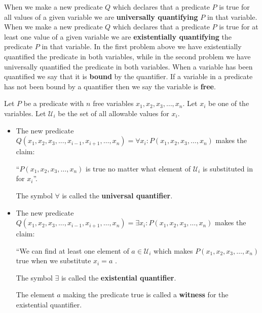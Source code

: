 When we make a new predicate $Q$ which declares that a predicate $P$ is true for all values of a given variable we are \textbf{universally quantifying} $P$ in that variable.   When we make a new predicate $Q$ which declares that a predicate $P$ is true for at least one value of a given variable we are \textbf{existentially quantifying} the predicate $P$ in that variable.  In the first problem above we have existentially quantified the predicate in both variables, while in the second problem we have universally quantified the predicate in both variables.  When a variable has been quantified we say that it is \textbf{bound} by the quantifier.  If a variable in a predicate has not been bound by a quantifier then we say the variable is \textbf{free}.

\begin{definition}
	Let $P$ be a predicate with $n$ free variables $x_1,x_2,x_3, \dots, x_n$.  
	Let $x_i$ be one of the variables. Let $\mathcal{U}_i$ be the set of all allowable values for $x_i$.
		\begin{itemize} 
			\item The new predicate $Q(x_1,x_2, x_3, ..., x_{i-1}, x_{i+1}, \dots , x_n) = \forall x_i  : P(x_1,x_2,x_3, \dots, x_n)$ makes the claim:
			
			``$P(x_1,x_2,x_3, \dots, x_n)$ is true no matter what element of $\mathcal{U}_i$ is substituted in for $x_i$''.
			
			The symbol $\forall$ is called the \textbf{universal quantifier}.
			
			\item The new predicate $Q(x_1,x_2, x_3, ..., x_{i-1}, x_{i+1}, \dots , x_n) = \exists x_i  : P(x_1,x_2,x_3, \dots, x_n)$ makes the claim:

``We can find at least one element of $a \in \mathcal{U}_i$ which makes $P(x_1,x_2,x_3, \dots, x_n)$ true when we substitute $x_i = a$ .

The symbol $\exists$ is called the \textbf{existential quantifier}.

The element $a$ making the predicate true is called a \textbf{witness} for the existential quantifier. 
		\end{itemize}  
	
	\end{definition}

